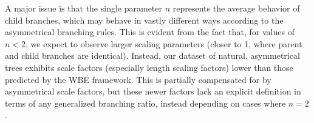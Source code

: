 \documentclass[]{article}
\begin{document}
A major issue is that the single parameter \(n\) represents the average
behavior of child branches, which may behave in vastly different ways
according to the asymmetrical branching rules. This is evident from the
fact that, for values of \(n < 2\), we expect to observe larger scaling
parameters (closer to 1, where parent and child branches are identical).
Instead, our dataset of natural, asymmetrical trees exhibits scale
factors (especially length scaling factors) lower than those predicted
by the WBE framework. This is partially compensated for by asymmetrical
scale factors, but these newer factors lack an explicit definition in
terms of any generalized branching ratio, instead depending on cases
where \(n = 2\).
\end{document}
